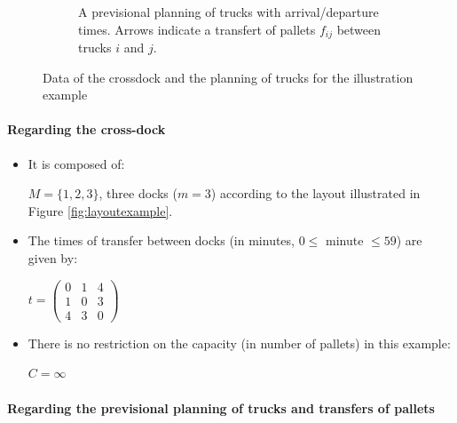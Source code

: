\documentclass[preprint,12pt,authoryear]{elsarticle}
\begin{document}
\begin{figure}[h!]
\begin{subfigure}{0.525\textwidth}
      \caption{A previsional planning of trucks with arrival/departure times. Arrows indicate a transfert of pallets $f_{ij}$ between trucks $i$ and $j$.}
      \label{fig:second}
    \end{subfigure}
    \caption{Data of the crossdock and the planning of trucks for the illustration example}
    \label{fig:Example1}
    \end{figure}

  
\vspace{-4mm}
\paragraph{Regarding the cross-dock}
\begin{itemize}
    \item It is composed of: 
    
      $M=\{1,2,3\}$, three docks ($m=3$)
      according to the layout illustrated in Figure \ref{fig:layoutexample}.
    
    \item The times of transfer between docks (in minutes, $0\le$ minute $\le59$) are given by:    
    
       $t=\begin{pmatrix} 
        0&1&4 \\ 
        1&0&3 \\  
        4&3&0
        \end{pmatrix}$ 

   \item There is no restriction on the capacity (in number of pallets) in this example:
   
      $C=\infty$    
   
\end{itemize}

 
\paragraph{Regarding the previsional planning of trucks and transfers of pallets}
\end{document}

